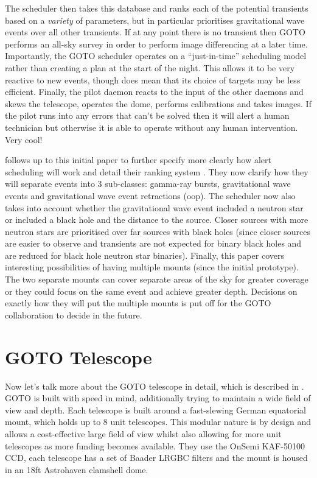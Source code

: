 \documentclass[twocolumn]{aastex631}
\begin{document}
The scheduler then takes this database and ranks each of the potential transients based on a \textit{variety} of parameters, but in particular prioritises gravitational wave events over all other transients. If at any point there is no transient then GOTO performs an all-sky survey in order to perform image differencing at a later time. Importantly, the GOTO scheduler operates on a ``just-in-time'' scheduling model rather than creating a plan at the start of the night. This allows it to be very reactive to new events, though does mean that its choice of targets may be less efficient. Finally, the pilot daemon reacts to the input of the other daemons and skews the telescope, operates the dome, performs calibrations and takes images. If the pilot runs into any errors that can't be solved then it will alert a human technician but otherwise it is able to operate without any human intervention. Very cool!

\citet{Dyer+2020} follows up to this initial paper to further specify more clearly how alert scheduling will work and detail their ranking system \citep[e.g.\ see Eq.~1][]{Dyer+2020}. They now clarify how they will separate events into 3 sub-classes: gamma-ray bursts, gravitational wave events and gravitational wave event retractions (oop). The scheduler now also takes into account whether the gravitational wave event included a neutron star or included a black hole and the distance to the source. Closer sources with more neutron stars are prioritised over far sources with black holes (since closer sources are easier to observe and transients are not expected for binary black holes and are reduced for black hole neutron star binaries). Finally, this paper covers interesting possibilities of having multiple mounts (since the initial prototype). The two separate mounts can cover separate areas of the sky for greater coverage or they could focus on the same event and achieve greater depth. Decisions on exactly how they will put the multiple mounts is put off for the GOTO collaboration to decide in the future.

\section{GOTO Telescope}
Now let's talk more about the GOTO telescope in detail, which is described in \citet{GOTO+2020}. GOTO is built with speed in mind, additionally trying to maintain a wide field of view and depth. Each telescope is built around a fast-slewing German equatorial mount, which holds up to 8 unit telescopes. This modular nature is by design and allows a cost-effective large field of view whilst also allowing for more unit telescopes as more funding becomes available. They use the OnSemi KAF-50100 CCD, each telescope has a set of Baader LRGBC filters and the mount is housed in an 18ft Astrohaven clamshell dome.
\end{document}
